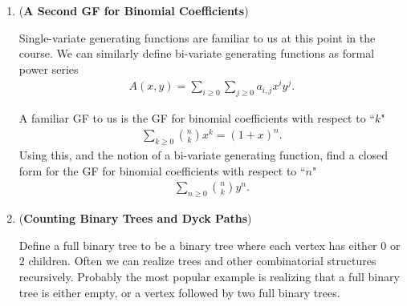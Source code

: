 \documentclass{article}
\newcommand{\question}[1]{\item (\textbf{#1})}
\theoremstyle{remark}
\begin{document}
\begin{enumerate}
    \question{A Second GF for Binomial Coefficients}
    
    Single-variate generating functions are familiar to us at this point in the course. We can similarly define bi-variate generating functions as formal power series
    \begin{align*}
        A(x,y) =  \sum_{i \geq 0} \sum_{j \geq 0} a_{i,j} x^i y^j.
    \end{align*}

    A familiar GF to us is the GF for binomial coefficients with respect to ``$k$"
    \begin{align*}
        \sum_{k \geq 0} \binom{n}{k} x^k = (1+x)^n.
    \end{align*}
    Using this, and the notion of a bi-variate generating function, find a closed form for the GF for binomial coefficients with respect to ``$n$"
    \begin{align*}
        \sum_{n \geq 0} \binom{n}{k} y^n.
    \end{align*}

    \question{Counting Binary Trees and Dyck Paths}

    Define a full binary tree to be a binary tree where each vertex has either $0$ or $2$ children. Often we can realize trees and other combinatorial structures recursively. Probably the most popular example is realizing that a full binary tree is either empty, or a vertex followed by two full binary trees.


\end{enumerate}
\end{document}
